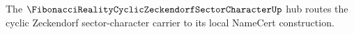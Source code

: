 The $\FibonacciRealityCyclicZeckendorfSectorCharacterUp$ hub routes the cyclic Zeckendorf sector-character carrier to its local NameCert construction.
